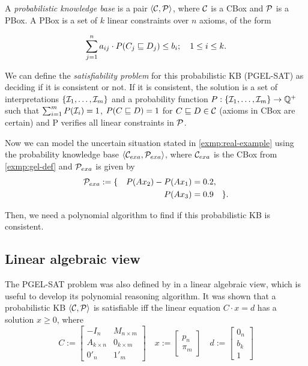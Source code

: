 A \emph{probabilistic knowledge base} is a pair $\langle\mathcal{C}, \mathcal{P}\rangle$, where $\mathcal{C}$ is a CBox and $\mathcal{P}$ is a PBox. A PBox is a set of $k$ linear constraints over $n$ axioms, of the form

\begin{equation}
	\label{eq:pbox-restric}
	\sum_{j = 1}^n a_{ij} \cdot P(C_j \sqsubseteq D_j) \leq b_i; \quad 1 \leq i \leq k.
\end{equation}

We can define the \emph{satisfiability problem} for this probabilistic KB (PGEL-SAT) as deciding if it is consistent or not. If it is consistent, the solution is a set of interpretations $\{\mathcal{I}_1, \dots, \mathcal{I}_m \}$ and a probability function $P: \{\mathcal{I}_1, \dots, \mathcal{I}_m \} \to \mathbb{Q}^+$ such that $\sum_{i = 1}^m P(\mathcal{I}_i) = 1$, $P(C \sqsubseteq D) = 1$ for $C \sqsubseteq D \in \mathcal{C}$ (axioms in CBox are certain) and P verifies all linear constraints in $\mathcal{P}$.
% 
\begin{example}
	Now we can model the uncertain situation stated in \cref{exmp:real-example} using the probability knowledge base $\langle\mathcal{C}_{exa}, \mathcal{P}_{exa}\rangle$, where $\mathcal{C}_{exa}$ is the CBox from \cref{exmp:gel-def} and $\mathcal{P}_{exa}$ is given by
	\begin{align*}
		\mathcal{P}_{exa} := \{ \quad P(Ax_2) - P(Ax_1) & = 0.2,           \\
		P(Ax_3)                                 & = 0.9  \quad \}.
	\end{align*}

	Then, we need a polynomial algorithm to find if this probabilistic KB is consistent.
\end{example}
% 
\subsection{Linear algebraic view}
\label{subsec:lin-alg-view}

The PGEL-SAT problem was also defined by \citet{Fin2020} in a linear algebraic view, which is useful to develop its polynomial reasoning algorithm. It was shown that a probabilistic KB $\langle\mathcal{C}, \mathcal{P}\rangle$ is satisfiable iff the linear equation $C \cdot x = d$ has a solution $x \geq 0$, where
% 
\begin{equation}
	\label{eq:pbox-linear}
	C := \begin{bmatrix}
		-I_n           & M_{n \times m} \\
		A_{k \times n} & 0_{k \times m} \\
		0'_n           & 1'_{m}
	\end{bmatrix}
	\quad
	x := \begin{bmatrix}
		p_n \\
		\pi_m
	\end{bmatrix}
	\quad
	d := \begin{bmatrix}
		0_n \\
		b_k \\
		1
	\end{bmatrix}
\end{equation}

